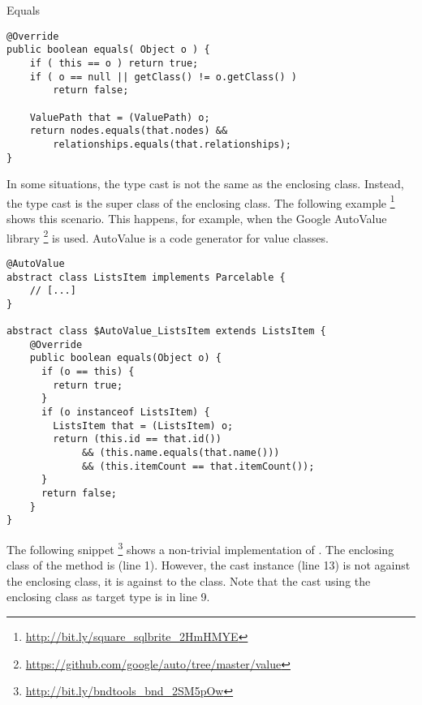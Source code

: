 \begin{pattern}{Equals}
\begin{verbatim}
@Override
public boolean equals( Object o ) {
    if ( this == o ) return true;
    if ( o == null || getClass() != o.getClass() )
        return false;

    ValuePath that = (ValuePath) o;
    return nodes.equals(that.nodes) &&
        relationships.equals(that.relationships);
}
\end{verbatim}

In some situations, the type cast is not the same as the enclosing class.
Instead, the type cast is the super class of the enclosing class.
The following example%
\footnote{\url{http://bit.ly/square_sqlbrite_2HmHMYE}}
shows this scenario.
This happens, for example, when the Google AutoValue library%
\footnote{\url{https://github.com/google/auto/tree/master/value}}
is used.
AutoValue is a code generator for value classes.

\begin{verbatim}
@AutoValue
abstract class ListsItem implements Parcelable {
    // [...]
}

abstract class $AutoValue_ListsItem extends ListsItem {
    @Override
    public boolean equals(Object o) {
      if (o == this) {
        return true;
      }
      if (o instanceof ListsItem) {
        ListsItem that = (ListsItem) o;
        return (this.id == that.id())
             && (this.name.equals(that.name()))
             && (this.itemCount == that.itemCount());
      }
      return false;
    }
}
\end{verbatim}

The following snippet%
\footnote{\url{http://bit.ly/bndtools_bnd_2SM5pOw}}
shows a non-trivial implementation of .
The enclosing class of the  method is  (line 1).
However, the cast instance (line 13) is not against the enclosing class,
it is against to the  class.
Note that the cast using the enclosing class as target type is in line 9.


\end{pattern}
